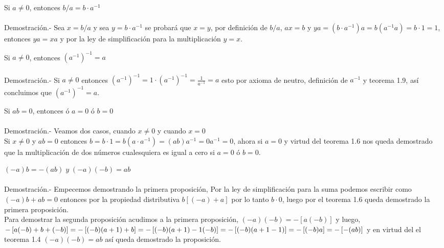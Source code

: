 \begin{enumerate}[\bfseries 1.]
\begin{teo}
Si $a\neq 0$, entonces $b/a=b\cdot a^{-1}$\\\\
Demostración.- \;
Sea $x =b/a$ y sea $y=b\cdot a^{-1}$ se probará que $x=y$, por definición de $b/a$, $ax=b$ y $ya=(b\cdot a^{-1})a=b(a^{-1}a)=b\cdot 1 = 1$, entonces $ya=xa$ y por la ley de simplificación para la multiplicación $y=x$. 
\end{teo}

\begin{teo}
Si $a\neq 0$, entonces $(a^{-1})^{-1}=a$\\\\
Demostración.- \;
Si $a\neq 0$ entonces  $(a^{-1})^{-1} = 1\cdot (a^{-1})^{-1} = \displaystyle\frac{1}{a^{-1}}=a$ esto por axioma de neutro, definición de $a^{-1}$ y teorema 1.9, así concluimos que $(a^{-1})^{-1}=a$.
\end{teo}

\begin{teo}
Si $ab = 0$, entonces ó $a=0$ ó $b=0$\\\\
Demostración.- \;
Veamos dos casos, cuando $x\neq 0$ y cuando $x=0$\\
Si $x\neq 0$ y  $ab = 0$ entonces  $b=b\cdot 1 = b (a\cdot a^{-1}) = (ab)a^{-1}=0a^{-1}=0$, ahora si $a=0$ y virtud del teorema 1.6 nos queda demostrado que la multiplicación de dos números cualesquiera es igual a cero si $a=0$ ó $b=0$. 
\end{teo}

\begin{teo}
$(-a)b=-(ab) \; y \; (-a)(-b) = ab$\\\\
Demostración.- \;
Empecemos demostrando la primera proposición, Por la ley de simplificación para la suma podemos escribir como $(-a)b+ab=0$ entonces por la propiedad distributiva $b\left[ (-a)+a \right]$ por lo tanto $b\cdot 0$, luego por el teorema 1.6 queda demostrado la primera proposición.\\
Para demostrar la segunda proposición acudimos a la primera proposición, $(-a)(-b)=-\left[ a(-b)\right]$ y luego, \\ $-\left[ a(-b)+b+(-b)\right]=-\left[ (-b)(a+1)+b\right]=-\left[ (-b)(a+1)-1(-b)\right]=-\left[( -b)(a+1-1)\\\right]=-\left[ (-b)a\right]=-\left[ -(ab)\right]$ y en virtud  del el teorema 1.4 $(-a)(-b)=ab$ así queda demostrado la proposición. 
\end{teo}


\end{enumerate}
